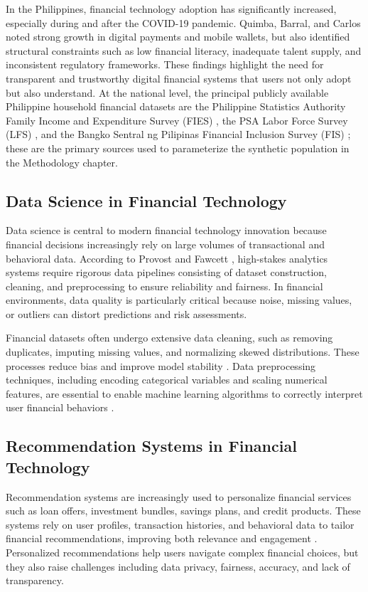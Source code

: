 \documentclass{icsthesis}
\begin{document}
\begin{mainmatter}
                In the Philippines, financial technology adoption has significantly increased, especially during and after the COVID-19 pandemic. Quimba, Barral, and Carlos \cite{ref9} noted strong growth in digital payments and mobile wallets, but also identified structural constraints such as low financial literacy, inadequate talent supply, and inconsistent regulatory frameworks. These findings highlight the need for transparent and trustworthy digital financial systems that users not only adopt but also understand. At the national level, the principal publicly available Philippine household financial datasets are the Philippine Statistics Authority Family Income and Expenditure Survey (FIES) \cite{ref40}, the PSA Labor Force Survey (LFS) \cite{ref41}, and the Bangko Sentral ng Pilipinas Financial Inclusion Survey (FIS) \cite{ref35}; these are the primary sources used to parameterize the synthetic population in the Methodology chapter.

			\subsection{Data Science in Financial Technology}
				Data science is central to modern financial technology innovation because financial decisions increasingly rely on large volumes of transactional and behavioral data. According to Provost and Fawcett \cite{ref10}, high-stakes analytics systems require rigorous data pipelines consisting of dataset construction, cleaning, and preprocessing to ensure reliability and fairness. In financial environments, data quality is particularly critical because noise, missing values, or outliers can distort predictions and risk assessments.

                Financial datasets often undergo extensive data cleaning, such as removing duplicates, imputing missing values, and normalizing skewed distributions. These processes reduce bias and improve model stability \cite{ref10}. Data preprocessing techniques, including encoding categorical variables and scaling numerical features, are essential to enable machine learning algorithms to correctly interpret user financial behaviors \cite{ref11}.

			\subsection{Recommendation Systems in Financial Technology}
				Recommendation systems are increasingly used to personalize financial services such as loan offers, investment bundles, savings plans, and credit products. These systems rely on user profiles, transaction histories, and behavioral data to tailor financial recommendations, improving both relevance and engagement \cite{ref13}. Personalized recommendations help users navigate complex financial choices, but they also raise challenges including data privacy, fairness, accuracy, and lack of transparency.


\end{mainmatter}
\end{document}
